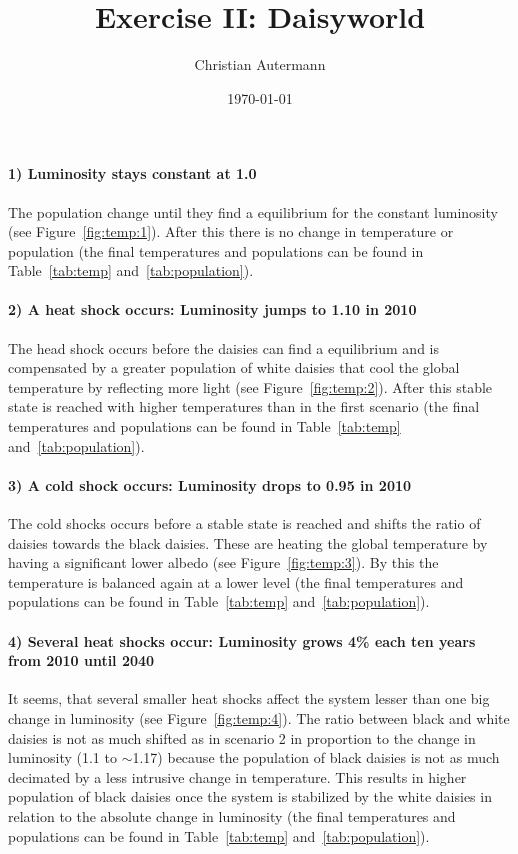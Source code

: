 \documentclass[12pt,a4paper,parskip]{scrartcl}
\title{\LARGE{Exercise II: Daisyworld}}
\author{\large{Christian Autermann}\\\large{\mail{autermann@uni-muenster.de}}}
\date{\large{\today}}
\begin{document}
\maketitle
\onehalfspacing

\paragraph{1) Luminosity stays constant at 1.0}
    The population change until they find a equilibrium for the constant luminosity (see Figure~\ref{fig:temp:1}).
    After this there is no change in temperature or population (the final temperatures and populations can be found in Table~\ref{tab:temp} and~\ref{tab:population}).

\paragraph{2) A heat shock occurs: Luminosity jumps to 1.10 in 2010}
    The head shock occurs before the daisies can find a equilibrium and is compensated by a greater population of white daisies that cool the global temperature by reflecting more light (see Figure~\ref{fig:temp:2}).
    After this stable state is reached with higher temperatures than in the first scenario (the final temperatures and populations can be found in Table~\ref{tab:temp} and~\ref{tab:population}).

\paragraph{3) A cold shock occurs: Luminosity drops to 0.95 in 2010}
    The cold shocks occurs before a stable state is reached and shifts the ratio of daisies towards the black daisies.
    These are heating the global temperature by having a significant lower albedo (see Figure~\ref{fig:temp:3}).
    By this the temperature is balanced again at a lower level (the final temperatures and populations can be found in Table~\ref{tab:temp} and~\ref{tab:population}). 

\paragraph{4) Several heat shocks occur: Luminosity grows 4\% each ten years from 2010 until 2040}
    It seems, that several smaller heat shocks affect the system lesser than one big change in luminosity (see Figure~\ref{fig:temp:4}).
    The ratio between black and white daisies is not as much shifted as in scenario 2 in proportion to the change in luminosity (1.1 to $\sim$1.17) because the population of black daisies is not as much decimated by a less intrusive change in temperature.
    This results in higher population of black daisies once the system is stabilized by the white daisies in relation to the absolute change in luminosity (the final temperatures and populations can be found in Table~\ref{tab:temp} and~\ref{tab:population}).
\end{document}
